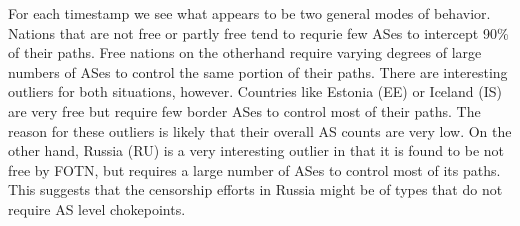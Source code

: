 For each timestamp we see what appears to be two general modes of behavior.
Nations that are not free or partly free tend to requrie few ASes to intercept
90\% of their paths. Free nations on the otherhand require varying degrees of
large numbers of ASes to control the same portion of their paths. There are
interesting outliers for both situations, however. Countries like Estonia (EE)
or Iceland (IS) are very free but require few border ASes to control most of
their paths. The reason for these outliers is likely that their overall AS
counts are very low. On the other hand, Russia (RU) is a very interesting
outlier in that it is found to be not free by FOTN, but requires a large number
of ASes to control most of its paths. This suggests that the censorship efforts
in Russia might be of types that do not require AS level chokepoints.

